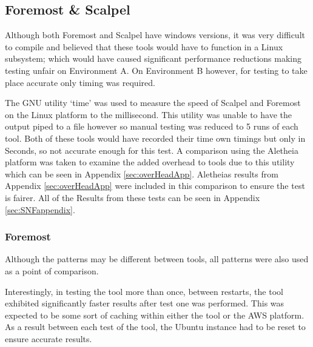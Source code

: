 \subsection{Foremost \& Scalpel}
\label{sec:ForemostScalpelRes}
Although both Foremost and Scalpel have windows versions, it was very difficult to compile and believed that these tools would have to function in a Linux subsystem;
which would have caused significant performance reductions making testing unfair on Environment A.
On Environment B however, for testing to take place accurate only timing was required.

The GNU utility `time' was used to measure the speed of Scalpel and Foremost on the Linux platform to the millisecond.
This utility was unable to have the output piped to a file however so manual testing was reduced to 5 runs of each tool.
Both of these tools would have recorded their time own timings but only in Seconds, so not accurate enough for this test.
A comparison using the Aletheia platform was taken to examine the added overhead to tools due to this utility which can be seen in Appendix \ref{sec:overHeadApp}.
Aletheias results from Appendix \ref{sec:overHeadApp} were included in this comparison to ensure the test is fairer.
All of the Results from these tests can be seen in Appendix \ref{sec:SNFappendix}.\\

\subsubsection*{Foremost}
Although the patterns may be different between tools, all patterns were also used as a point of comparison.

Interestingly, in testing the tool more than once, between restarts, the tool exhibited significantly faster results after test one was performed.
This was expected to be some sort of caching within either the tool or the \ac{AWS} platform.
As a result between each test of the tool, the Ubuntu instance had to be reset to ensure accurate results.